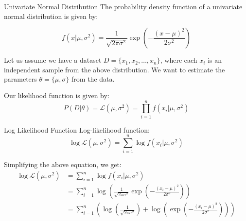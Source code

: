 \documentclass[handout]{beamer}
\begin{document}
\begin{frame}{Univariate Normal Distribution}
The probability density function of a univariate normal distribution is given by:

\begin{equation}
f(x|\mu, \sigma^2) = \frac{1}{\sqrt{2\pi\sigma^2}}\exp\left(-\frac{(x-\mu)^2}{2\sigma^2}\right)
\end{equation}

Let us assume we have a dataset $D = \{x_1, x_2, \ldots, x_n\}$, where each $x_i$ is an independent sample from the above distribution. 
We want to estimate the parameters $\theta = \{\mu, \sigma\}$ from the data.

Our likelihood function is given by:
\begin{equation}
P(D|\theta) = \mathcal{L}(\mu, \sigma^2) = \prod_{i=1}^n f(x_i|\mu, \sigma^2)
\end{equation}


\end{frame}

\begin{frame}{Log Likelihood Function}
    Log-likelihood function:
    \begin{equation}
        \log \mathcal{L}(\mu, \sigma^2) = \sum_{i=1}^n \log f(x_i|\mu, \sigma^2)
    \end{equation}

    Simplifying the above equation, we get:
    \begin{align*}
        \log \mathcal{L}(\mu, \sigma^2) &= \sum_{i=1}^n \log f(x_i|\mu, \sigma^2) \\
        &= \sum_{i=1}^n \log \left( \frac{1}{\sqrt{2\pi\sigma^2}} \exp \left( -\frac{(x_i-\mu)^2}{2\sigma^2} \right) \right) \\
        &= \sum_{i=1}^n \left( \log \left( \frac{1}{\sqrt{2\pi\sigma^2}} \right) + \log \left( \exp \left( -\frac{(x_i-\mu)^2}{2\sigma^2} \right) \right) \right) \\
        \end{align*}
\end{frame}
\end{document}
